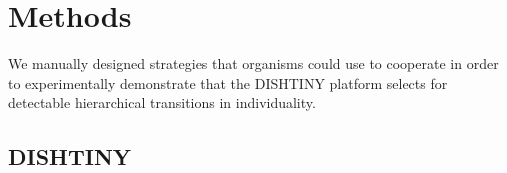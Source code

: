 \section{Methods}

We manually designed strategies that organisms could use to cooperate in order to experimentally demonstrate that the DISHTINY platform selects for detectable hierarchical transitions in individuality.


\subsection{DISHTINY}




